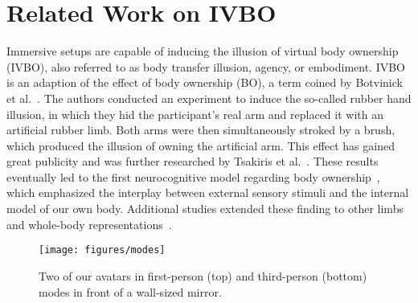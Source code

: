 \documentclass[conference]{IEEEtran}
\begin{document}


\section{Related Work on IVBO}

Immersive setups are capable of inducing the illusion of virtual body ownership (IVBO), also referred to as body transfer illusion, agency, or embodiment. IVBO~\cite{lugrin2015anthropomorphism} is an adaption of the effect of body ownership (BO), a term coined by Botvinick et al.~\cite{botvinick1998rubber}. The authors conducted an experiment to induce the so-called rubber hand illusion, in which they hid the participant’s real arm and replaced it with an artificial rubber limb. Both arms were then simultaneously stroked by a brush, which produced the illusion of owning the artificial arm. This effect has gained great publicity and was further researched by Tsakiris et al.~\cite{tsakiris2005rubber}. These results eventually led to the first neurocognitive model regarding body ownership~\cite{tsakiris2010my}, which emphasized the interplay between external sensory stimuli and the internal model of our own body. Additional studies extended
these finding to other limbs and whole-body representations~\cite{ehrsson2007experimental,petkova2008if,lenggenhager2007video}.

\begin{figure}[t]
\centering
\texttt{[image: figures/modes]}
\caption{Two of our avatars in first-person (top) and third-person (bottom) modes in front of a wall-sized mirror.}
\label{fig:modes}
\end{figure}
\end{document}
